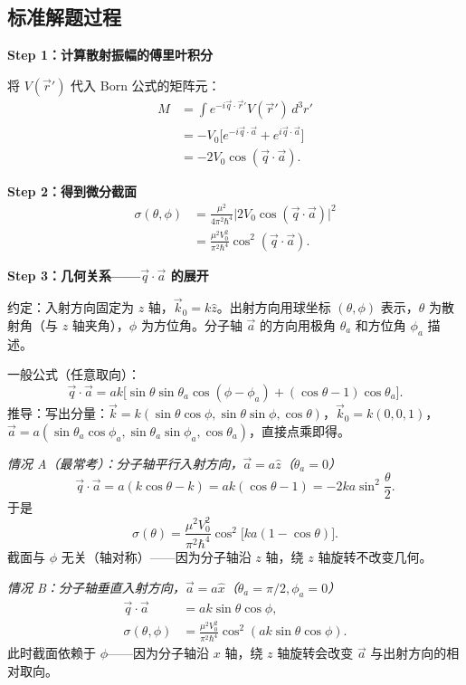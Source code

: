 \subsection{标准解题过程}

\begin{derivationbox}[标准解题过程]
\textbf{Step 1：计算散射振幅的傅里叶积分}

将 $V(\vec{r}')$ 代入 Born 公式的矩阵元：
\begin{align*}
M &= \int e^{-i\vec{q}\cdot\vec{r}'} V(\vec{r}')\,d^3r' \\
&= -V_0\bigl[e^{-i\vec{q}\cdot\vec{a}} + e^{i\vec{q}\cdot\vec{a}}\bigr] \\
&= -2V_0\cos(\vec{q}\cdot\vec{a}).
\end{align*}

\textbf{Step 2：得到微分截面}
\begin{align*}
\sigma(\theta,\phi) &= \frac{\mu^2}{4\pi^2\hbar^4}\bigl|2V_0\cos(\vec{q}\cdot\vec{a})\bigr|^2 \\
&= \frac{\mu^2 V_0^2}{\pi^2\hbar^4}\cos^2(\vec{q}\cdot\vec{a}).
\end{align*}

\textbf{Step 3：几何关系——$\vec{q}\cdot\vec{a}$ 的展开}

约定：入射方向固定为 $z$ 轴，$\vec{k}_0 = k\hat{z}$。出射方向用球坐标 $(\theta,\phi)$ 表示，$\theta$ 为散射角（与 $z$ 轴夹角），$\phi$ 为方位角。分子轴 $\vec{a}$ 的方向用极角 $\theta_a$ 和方位角 $\phi_a$ 描述。

一般公式（任意取向）：
\[
\vec{q}\cdot\vec{a} = ak\bigl[\sin\theta\sin\theta_a\cos(\phi-\phi_a) + (\cos\theta-1)\cos\theta_a\bigr].
\]
推导：写出分量：$\vec{k} = k(\sin\theta\cos\phi, \sin\theta\sin\phi, \cos\theta)$，$\vec{k}_0 = k(0,0,1)$，$\vec{a} = a(\sin\theta_a\cos\phi_a, \sin\theta_a\sin\phi_a, \cos\theta_a)$，直接点乘即得。

\textit{情况 A（最常考）：分子轴平行入射方向，$\vec{a} = a\hat{z}$（$\theta_a = 0$）}
\[
\vec{q}\cdot\vec{a} = a(k\cos\theta - k) = ak(\cos\theta - 1) = -2ka\sin^2\frac{\theta}{2}.
\]
于是
\[
\sigma(\theta) = \frac{\mu^2 V_0^2}{\pi^2\hbar^4}\cos^2\bigl[ka(1-\cos\theta)\bigr].
\]
截面与 $\phi$ 无关（轴对称）——因为分子轴沿 $z$ 轴，绕 $z$ 轴旋转不改变几何。

\textit{情况 B：分子轴垂直入射方向，$\vec{a} = a\hat{x}$（$\theta_a = \pi/2, \phi_a = 0$）}
\begin{align*}
\vec{q}\cdot\vec{a} &= ak\sin\theta\cos\phi, \\
\sigma(\theta,\phi) &= \frac{\mu^2 V_0^2}{\pi^2\hbar^4}\cos^2(ak\sin\theta\cos\phi).
\end{align*}
此时截面依赖于 $\phi$——因为分子轴沿 $x$ 轴，绕 $z$ 轴旋转会改变 $\vec{a}$ 与出射方向的相对取向。


\end{derivationbox}
